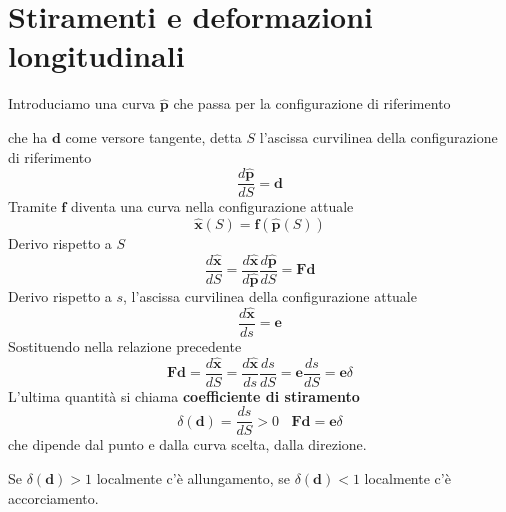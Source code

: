\documentclass[10pt,a4paper,twoside]{book}
\begin{document}
\section{Stiramenti e deformazioni longitudinali}

Introduciamo una curva $\hat{\mathbf{p}}$ che passa per la configurazione di riferimento


che ha $\mathbf{d}$ come versore tangente, detta $S$ l'ascissa curvilinea della configurazione di riferimento
\begin{equation*}
\frac{d\hat{\mathbf{p}}}{dS} =\mathbf{d}
\end{equation*}
Tramite $\mathbf{f}$ diventa una curva nella configurazione attuale
\begin{equation*}
\hat{\mathbf{x}}( S) =\mathbf{f}(\hat{\mathbf{p}}( S))
\end{equation*}
Derivo rispetto a $S$
\begin{equation*}
\frac{d\hat{\mathbf{x}}}{dS} =\frac{d\hat{\mathbf{x}}}{d\hat{\mathbf{p}}}\frac{d\hat{\mathbf{p}}}{dS} =\mathbf{Fd}
\end{equation*}
Derivo rispetto a $s$, l'ascissa curvilinea della configurazione attuale
\begin{equation*}
\frac{d\hat{\mathbf{x}}}{ds} =\mathbf{e}
\end{equation*}
Sostituendo nella relazione precedente
\begin{equation*}
\mathbf{Fd} =\frac{d\hat{\mathbf{x}}}{dS} =\frac{d\hat{\mathbf{x}}}{ds}\frac{ds}{dS} =\mathbf{e}\frac{ds}{dS} =\mathbf{e} \delta 
\end{equation*}
L'ultima quantità si chiama \textbf{coefficiente di stiramento}
\begin{equation*}
\boxed{\delta (\mathbf{d}) =\frac{ds}{dS}  >0} \ \ \ \ \boxed{\mathbf{Fd} =\mathbf{e} \delta }
\end{equation*}
che dipende dal punto e dalla curva scelta, dalla direzione.

Se $\delta (\mathbf{d})  >1$ localmente c'è allungamento, se $\delta (\mathbf{d}) < 1$ localmente c'è accorciamento.
\end{document}
